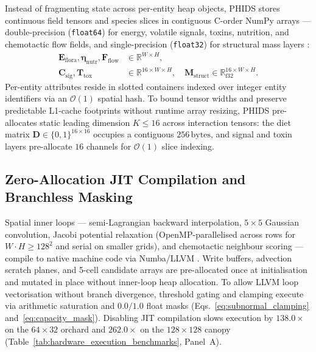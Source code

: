 Instead of fragmenting state across per-entity heap objects, PHIDS stores continuous field tensors and species slices in contiguous C-order NumPy arrays --- double-precision (\texttt{float64}) for energy, volatile signals, toxins, nutrition, and chemotactic flow fields, and single-precision (\texttt{float32}) for structural mass layers \cite{harris2020array}:
\begin{align}
  \mathbf{E}_{\mathrm{flora}}, \bm{\eta}_{\mathrm{nutr}}, \mathbf{F}_{\mathrm{flow}} &\in \mathbb{R}^{W \times H}, \\
  \mathbf{C}_{\mathrm{sig}}, \mathbf{T}_{\mathrm{tox}} &\in \mathbb{R}^{16 \times W \times H}, \quad \mathbf{M}_{\mathrm{struct}} \in \mathbb{R}_{\mathrm{f32}}^{16 \times W \times H}.
\end{align}
Per-entity attributes reside in slotted containers indexed over integer entity identifiers via an $\mathcal{O}(1)$ spatial hash. To bound tensor widths and preserve predictable L1-cache footprints without runtime array resizing, PHIDS pre-allocates static leading dimension $K \le 16$ across interaction tensors: the diet matrix $\mathbf{D} \in \{0, 1\}^{16 \times 16}$ occupies a contiguous $256\,\text{bytes}$, and signal and toxin layers pre-allocate $16$ channels for $\mathcal{O}(1)$ slice indexing.

\subsection{Zero-Allocation JIT Compilation and Branchless Masking}
\label{subsec:jit_compilation_simd}

Spatial inner loops --- semi-Lagrangian backward interpolation, $5 \times 5$ Gaussian convolution, Jacobi potential relaxation (OpenMP-parallelised across rows for $W \cdot H \ge 128^2$ and serial on smaller grids), and chemotactic neighbour scoring --- compile to native machine code via Numba/LLVM \cite{lam2015numba}. Write buffers, advection scratch planes, and 5-cell candidate arrays are pre-allocated once at initialisation and mutated in place without inner-loop heap allocation. To allow LLVM loop vectorisation without branch divergence, threshold gating and clamping execute via arithmetic saturation and $0.0/1.0$ float masks (Eqs.~\eqref{eq:subnormal_clamping} and~\eqref{eq:capacity_mask}). Disabling JIT compilation slows execution by $138.0\times$ on the $64 \times 32$ orchard and $262.0\times$ on the $128 \times 128$ canopy (Table~\ref{tab:hardware_execution_benchmarks}, Panel~A).

